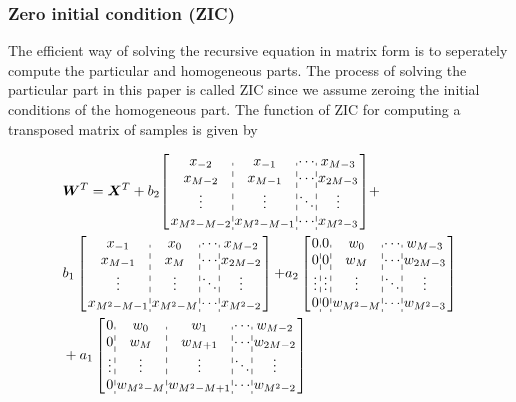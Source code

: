 \subsubsection{Zero initial condition (ZIC)}

The efficient way of solving the recursive equation in matrix form is to seperately compute
the particular and homogeneous parts. The process of solving the particular part in this paper is called
ZIC since we assume zeroing the initial conditions of the homogeneous part. 
The function of ZIC for computing a transposed matrix of samples is given by

\begin{equation}
    \label{eq:ZIC}
    \begin{aligned}
        &\bm{W}^T = \bm{X}^T 
        + b_2{\left[\arraycolsep=1.0pt\def\arraystretch{1.0}
        \begin{array}{c:c:c:c}
        x_{-2} & x_{-1} & \cdots & x_{M-3} \\ 
        x_{M-2} & x_{M-1} & \cdots & x_{2M-3} \\
        \vdots & \vdots & \ddots & \vdots \\
        x_{M^2-M-2} & x_{M^2-M-1} & \cdots & x_{M^2-3} \\
        \end{array}\right]} + \\ 
        & b_1\left[\arraycolsep=1.0pt\def\arraystretch{1.0}
        \begin{array}{c:c:c:c}
        x_{-1} & x_0 & \cdots & x_{M-2} \\ 
        x_{M-1} & x_M & \cdots & x_{2M-2} \\
        \vdots & \vdots & \ddots & \vdots \\
        x_{M^2-M-1} & x_{M^2-M} & \cdots & x_{M^2-2} \\
        \end{array}\right]
        {+} a_2\left[\arraycolsep=1.0pt\def\arraystretch{1.0}
                \begin{array}{c:c:c:c:c}
                0 & 0 & w_0 & \cdots & w_{M-3} \\ 
                0 & 0 & w_M & \cdots & w_{2M-3} \\
                \vdots & \vdots & \vdots & \ddots & \vdots \\
                0 & 0 & w_{M^2-M} & \cdots & w_{M^2-3} \\
                \end{array}\right] \\
        &+ a_1\left[\arraycolsep=1.0pt\def\arraystretch{1.0}
            \begin{array}{c:c:c:c:c}
            0 & w_0 & w_1 & \cdots & w_{M-2} \\ 
            0 & w_M & w_{M+1} & \cdots & w_{2M-2} \\
            \vdots & \vdots & \vdots & \ddots & \vdots \\
            0 & w_{M^2-M} & w_{M^2-M+1} & \cdots & w_{M^2-2} \\
            \end{array}\right]
    \end{aligned}
\end{equation}
